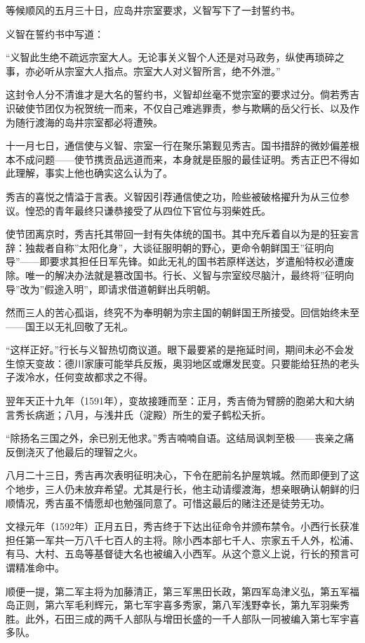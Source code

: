 \documentclass[
]{article}
\begin{document}
等候顺风的五月三十日，应岛井宗室要求，义智写下了一封誓约书。

义智在誓约书中写道：

``义智此生绝不疏远宗室大人。无论事关义智个人还是对马政务，纵使再琐碎之事，亦必听从宗室大人指点。宗室大人对义智所言，绝不外泄。''

这封令人分不清谁才是大名的誓约书，义智却丝毫不觉宗室的要求过分。倘若秀吉识破使节团仅为祝贺统一而来，不仅自己难逃罪责，参与欺瞒的岳父行长、以及作为随行渡海的岛井宗室都必将遭殃。

十一月七日，通信使与义智、宗室一行在聚乐第觐见秀吉。国书措辞的微妙偏差根本不成问题------使节携贡品远道而来，本身就是臣服的最佳证明。秀吉正巴不得如此理解，事实上他也确实这么认为了。

秀吉的喜悦之情溢于言表。义智因引荐通信使之功，险些被破格擢升为从三位参议。惶恐的青年最终只谦恭接受了从四位下官位与羽柴姓氏。

使节团离京时，秀吉托其带回一封有失体统的国书。其中充斥着自以为是的狂妄言辞：独裁者自称''太阳化身''，大谈征服明朝的野心，更命令朝鲜国王''征明向导''------即要求其担任日军先锋。如此无礼的国书若原样送达，岁遣船特权必遭废除。唯一的解决办法就是篡改国书。行长、义智与宗室绞尽脑汁，最终将''征明向导''改为''假途入明''，即请求借道朝鲜出兵明朝。

然而三人的苦心孤诣，终究不为奉明朝为宗主国的朝鲜国王所接受。回信始终未至------国王以无礼回敬了无礼。

``这样正好。''行长与义智热切商议道。眼下最要紧的是拖延时间，期间未必不会发生惊天变故：德川家康可能举兵反叛，奥羽地区或爆发民变。只要能给狂热的老头子泼冷水，任何变故都求之不得。

翌年天正十九年（1591年），变故接踵而至：正月，秀吉倚为臂膀的胞弟大和大纳言秀长病逝；八月，与浅井氏（淀殿）所生的爱子鹤松夭折。

``除扬名三国之外，余已别无他求。''秀吉喃喃自语。这结局讽刺至极------丧亲之痛反倒浇灭了他最后的理智之火。

八月二十三日，秀吉再次表明征明决心，下令在肥前名护屋筑城。然而即便到了这个地步，三人仍未放弃希望。尤其是行长，他主动请缨渡海，想亲眼确认朝鲜的归顺情况，秀吉虽不情愿却也勉强同意了。可惜这最后的赌注还是徒劳无功。

文禄元年（1592年）正月五日，秀吉终于下达出征命令并颁布禁令。小西行长获准担任第一军共一万八千七百人的主将。除小西本部七千人、宗家五千人外，松浦、有马、大村、五岛等基督徒大名也被编入小西军。从这个意义上说，行长的预言可谓精准命中。

顺便一提，第二军主将为加藤清正，第三军黑田长政，第四军岛津义弘，第五军福岛正则，第六军毛利辉元，第七军宇喜多秀家，第八军浅野幸长，第九军羽柴秀胜。此外，石田三成的两千人部队与增田长盛的一千人部队一同被编入第七军宇喜多队。
\end{document}
